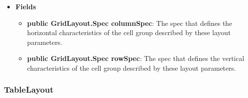 \documentclass{report}
\begin{document}
\begin{itemize}
\begin{itemize}
            \end{itemize}
        \item \textbf{Fields}
            \begin{itemize}
                \item \textbf{public GridLayout.Spec columnSpec}: The spec that defines the horizontal characteristics of the cell group described by these layout parameters.
                \item \textbf{public GridLayout.Spec rowSpec}: The spec that defines the vertical characteristics of the cell group described by these layout parameters.
            \end{itemize}

    \end{itemize}

    \pagebreak 
    \subsubsection{TableLayout}
\end{document}
